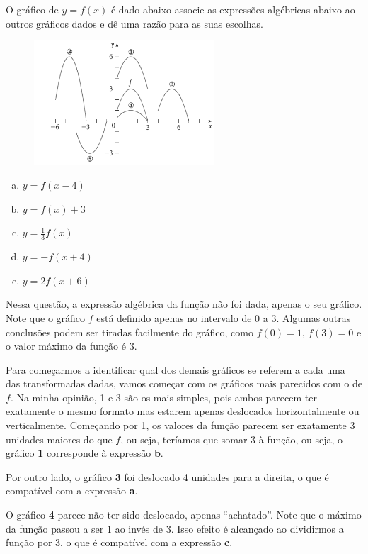 \documentclass[main_estudante.tex]{subfiles}
\begin{document}
\begin{resolvida}
O gráfico de $y=f(x)$ é dado abaixo associe as expressões algébricas abaixo ao outros gráficos dados e dê uma razão para as suas escolhas.

\begin{figure}[h]
\centering
\includegraphics[width=0.6\textwidth]{./img/c7r1.png}
\end{figure}

\begin{enumerate}[a)]
\item $y=f(x-4)$
\item $y=f(x)+3$
\item $y= \frac{1}{3}f(x)$
\item $y=-f(x+4)$
\item $y=2f(x+6)$
\end{enumerate}
\end{resolvida}

Nessa questão, a expressão algébrica da função não foi dada, apenas o seu gráfico. Note que o gráfico $f$ está definido apenas no intervalo de $0$ a $3$. Algumas outras conclusões podem ser tiradas facilmente do gráfico, como $f(0)=1$, $f(3)=0$ e o valor máximo da função é $3$.

Para começarmos a identificar qual dos demais gráficos se referem a cada uma das transformadas dadas, vamos começar com os gráficos mais parecidos com o de $f$. Na minha opinião, 1 e 3 são os mais simples, pois ambos parecem ter exatamente o mesmo formato mas estarem apenas deslocados horizontalmente ou verticalmente. Começando por 1, os valores da função parecem ser exatamente 3 unidades maiores do que $f$, ou seja, teríamos que somar 3 à função, ou seja, o gráfico \textbf{1} corresponde à expressão \textbf{b}.

Por outro lado, o gráfico \textbf{3} foi deslocado 4 unidades para a direita, o que é compatível com a expressão \textbf{a}.

O gráfico \textbf{4} parece não ter sido deslocado, apenas ``achatado''. Note que o máximo da função passou a ser $1$ ao invés de $3$. Isso efeito é alcançado ao dividirmos a função por $3$, o que é compatível com a expressão \textbf{c}.
\end{document}
